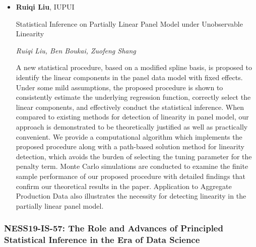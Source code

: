 \begin{itemize}
\item \textbf{Ruiqi Liu}, IUPUI

Statistical Inference on Partially Linear Panel Model under Unobservable Linearity

\emph{\footnotesize Ruiqi Liu, Ben Boukai, Zuofeng Shang}

A new statistical procedure,  based on a modified spline basis, is proposed to identify the linear components in the panel data model with fixed effects. Under some mild assumptions, the proposed procedure is shown to consistently estimate the underlying regression function,  correctly select the linear components, and effectively conduct the statistical inference. When compared to existing methods for detection of  linearity in panel model, our approach is demonstrated to be  theoretically justified as well as practically convenient. We provide a computational algorithm which implements the proposed procedure along with a path-based solution method for linearity detection, which avoids the burden of selecting the tuning parameter for the penalty term. Monte Carlo simulations are conducted to examine the finite sample performance of our proposed procedure with detailed findings that confirm our theoretical results in the paper. Application to  Aggregate Production Data also illustrates the necessity for detecting linearity in the partially linear panel model.

\end{itemize}

\subsubsection*{NESS19-IS-57: The Role and Advances of Principled Statistical Inference in the Era of Data Science}

